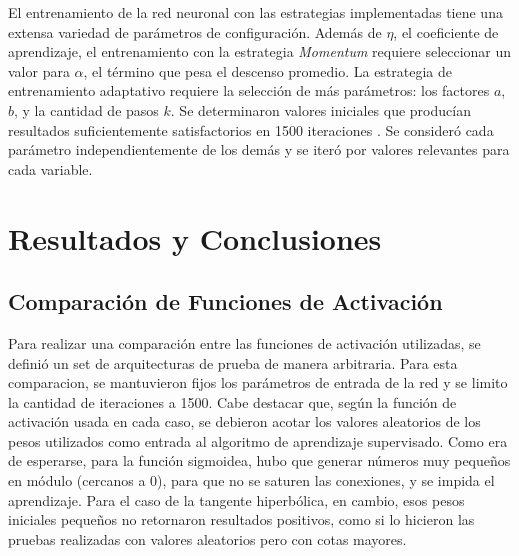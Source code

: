\documentclass[a4paper,10pt]{article}
\begin{document}
        \label{sec:configuracion}
        El entrenamiento de la red neuronal con las estrategias implementadas tiene una extensa variedad de parámetros de configuración. Además de $\eta$, 
        el coeficiente de aprendizaje, el entrenamiento con la estrategia \textit{Momentum} requiere seleccionar un valor para $\alpha$, el término que pesa el descenso promedio. 
        La estrategia de entrenamiento adaptativo requiere la selección de más parámetros: los factores $a$, $b$, y la cantidad de pasos $k$.
        Se determinaron valores iniciales que producían resultados suficientemente satisfactorios en 1500 iteraciones . Se consideró cada parámetro independientemente de 
        los demás y se iteró por valores relevantes para cada variable.

\section{Resultados y Conclusiones}

    \subsection{Comparación de Funciones de Activación}
    \label{sec:comparacion-activacion}

    Para realizar una comparación entre las funciones de activación utilizadas, se definió un set de arquitecturas de prueba de manera arbitraria.
    Para esta comparacion, se mantuvieron fijos los parámetros de entrada de la red y se limito la cantidad de iteraciones a 1500.
    Cabe destacar que, según la función de activación usada en cada caso, se debieron acotar los valores aleatorios de los pesos utilizados como entrada al algoritmo de aprendizaje
    supervisado. Como era de esperarse, para la función sigmoidea, hubo que generar números muy pequeños en módulo (cercanos a 0), para que no se saturen las conexiones, y se impida el aprendizaje.
    Para el caso de la tangente hiperbólica, en cambio, esos pesos  iniciales pequeños no retornaron resultados positivos, como si lo hicieron las pruebas realizadas con valores 
    aleatorios pero con cotas mayores.
\end{document}
